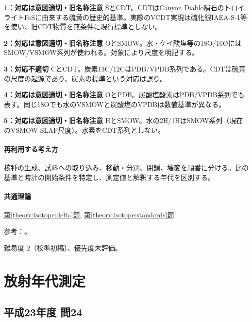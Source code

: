 \noindent\textbf{1：対応は意図適切・旧名称注意} SとCDT。CDTはCanyon Diablo隕石のトロイライトFeSに由来する硫黄の歴史的基準。実際のVCDT実現は硫化銀IAEA-S-1等を使い、旧CDT物質を無条件に現行標準としない。\par

\noindent\textbf{2：対応は意図適切・旧名称注意} OとSMOW。水・ケイ酸塩等の18O/16OにはSMOW/VSMOW系列が使われる。対象により尺度を明記する。\par

\noindent\textbf{3：対応不適切} CとCDT。炭素13C/12CはPDB/VPDB系列である。CDTは硫黄の尺度の起源であり、炭素の標準という対応は誤り。\par

\noindent\textbf{4：対応は意図適切・旧名称注意} OとPDB。炭酸塩酸素はPDB/VPDB系列でも表す。同じ18Oでも水のVSMOWと炭酸塩のVPDBは数値基準が異なる。\par

\noindent\textbf{5：対応は意図適切・旧名称注意} HとSMOW。水の2H/1HはSMOW系列（現在のVSMOW-SLAP尺度）。水素をCDT系列としない。\par

\paragraph{再利用する考え方} 核種の生成、試料への取り込み、移動・分別、閉鎖、壊変を順番に分ける。比の基準と時計の開始条件を特定し、測定値と解釈する年代を区別する。

\paragraph{共通理論} \hyperref[theory:isotope:delta]{第\ref*{theory:isotope:delta}節}, \hyperref[theory:isotope:standards]{第\ref*{theory:isotope:standards}節}

\par 参考：\cite{iso_standards1995,iso_vsmow2,iso_vcdt}。

\par 難易度 2（校準初稿）、優先度未評価。

\section{放射年代測定}

\subsection{平成23年度 問24}
\label{q:h23-reg-applied-24}

